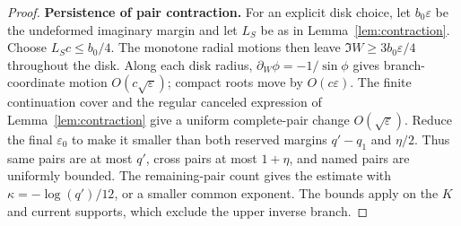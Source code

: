 \documentclass[11pt]{article}
\numberwithin{equation}{section}
\theoremstyle{definition}
\newcommand{\eps}{\varepsilon}
\begin{document}
\begin{proof}
\par\smallskip\noindent\textbf{Persistence of pair contraction.} For an explicit disk choice, let \(b_0\eps\) be the
undeformed imaginary margin and let \(L_S\) be as in
Lemma~\ref{lem:contraction}. Choose \(L_Sc\le b_0/4\).
The monotone radial motions then leave \(\Im W\ge3b_0\eps/4\)
throughout the disk. Along each disk radius,
\(\partial_W\phi=-1/\sin\phi\) gives branch-coordinate motion
\(O(c\sqrt\eps)\); compact roots move by \(O(c\eps)\).
The finite continuation cover and the regular canceled expression
of Lemma~\ref{lem:contraction} give a uniform complete-pair change
\(O(\sqrt\eps)\). Reduce the final \(\eps_0\) to make it
smaller than both reserved margins \(q'-q_1\) and \(\eta/2\).
Thus same pairs are at most \(q'\), cross pairs at most
\(1+\eta\), and named pairs are uniformly bounded.
The remaining-pair count gives the estimate with
\(\kappa=-\log(q')/12\), or a smaller common exponent. The bounds
apply on the \(K\) and current supports, which exclude the upper
inverse branch.
\end{proof}
\end{document}
